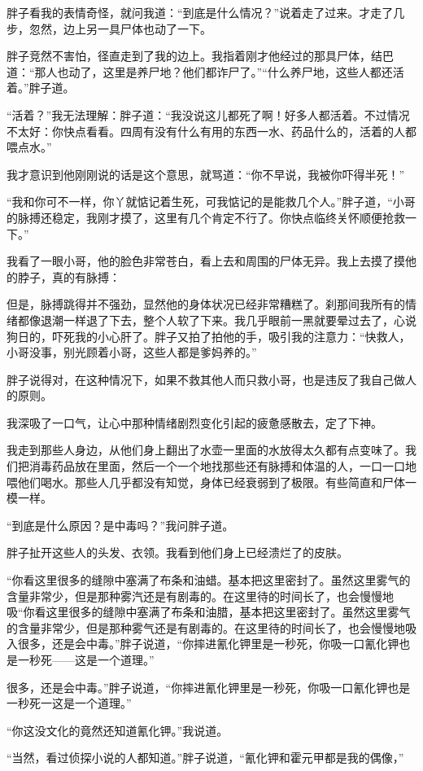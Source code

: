 胖子看我的表情奇怪，就问我道：“到底是什么情况？”说着走了过来。才走了几步，忽然，边上另一具尸体也动了一下。

胖子竞然不害怕，径直走到了我的边上。我指着刚才他经过的那具尸体，结巴道：“那人也动了，这里是养尸地？他们都诈尸了。”“什么养尸地，这些人都还活着。”胖子道。

“活着？”我无法理解：胖子道：“我没说这儿都死了啊！好多人都活着。不过情况不太好：你快点看看。四周有没有什么有用的东西一水、药品什么的，活着的人都喂点水。”

我才意识到他刚刚说的话是这个意思，就骂道：“你不早说，我被你吓得半死！”

“我和你可不一样，你丫就惦记着生死，可我惦记的是能救几个人。”胖子道，“小哥的脉搏还稳定，我刚才摸了，这里有几个肯定不行了。你快点临终关怀顺便抢救一下。”

我看了一眼小哥，他的脸色非常苍白，看上去和周围的尸体无异。我上去摸了摸他的脖子，真的有脉搏：

但是，脉搏跳得并不强劲，显然他的身体状况已经非常糟糕了。刹那间我所有的情绪都像退潮一样退了下去，整个人软了下来。我几乎眼前一黑就要晕过去了，心说狗日的，吓死我的小心肝了。胖子又拍了拍他的手，吸引我的注意力：“快救人，小哥没事，别光顾着小哥，这些人都是爹妈养的。”

胖子说得对，在这种情况下，如果不救其他人而只救小哥，也是违反了我自己做人的原则。

我深吸了一口气，让心中那种情绪剧烈变化引起的疲惫感散去，定了下神。

我走到那些人身边，从他们身上翻出了水壶一里面的水放得太久都有点变味了。我们把消毒药品放在里面，然后一个一个地找那些还有脉搏和体温的人，一口一口地喂他们喝水。那些人几乎都没有知觉，身体已经衰弱到了极限。有些简直和尸体一模一样。

“到底是什么原因？是中毒吗？”我问胖子道。

胖子扯开这些人的头发、衣领。我看到他们身上已经溃烂了的皮肤。

“你看这里很多的缝隙中塞满了布条和油蜡。基本把这里密封了。虽然这里雾气的含量非常少，但是那种雾汽还是有剧毒的。在这里待的时间长了，也会慢慢地吸“你看这里很多的缝隙中塞满了布条和油腊，基本把这里密封了。虽然这里雾气的含量非常少，但是那种雾气还是有剧毒的。在这里待的时间长了，也会慢慢地吸入很多，还是会中毒。”胖子说道，“你摔进氰化钾里是一秒死，你吸一口氰化钾也是一秒死——这是一个道理。”

很多，还是会中毒。”胖子说道，“你摔进氰化钾里是一秒死，你吸一口氰化钾也是一秒死一这是一个道理。”

“你这没文化的竟然还知道氰化钾。”我说道。

“当然，看过侦探小说的人都知道。”胖子说道，“氰化钾和霍元甲都是我的偶像，”

